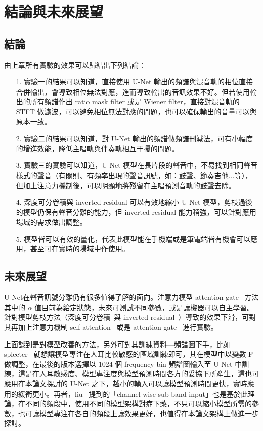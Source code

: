 \chapter{結論與未來展望}


\section{結論}

由上章所有實驗的效果可以歸結出下列結論：
\begin{itemize}
    \item[1.] 實驗一的結果可以知道，直接使用 U-Net 輸出的頻譜與混音軌的相位直接合併輸出，會導致相位無法對應，進而導致輸出的音訊效果不好。但若使用輸出的所有頻譜作出 ratio mask filter 或是 Wiener filter，直接對混音軌的 STFT 做濾波，可以避免相位無法對應的問題，也可以確保輸出的音量可以與原本一致。
    \item[2.] 實驗二的結果可以知道，對 U-Net 輸出的頻譜做頻譜刪減法，可有小幅度的增進效能，降低主唱軌與伴奏軌相互干擾的問題。
    \item[3.] 實驗三的實驗可以知道，U-Net 模型在長片段的聲音中，不易找到相同聲音樣式的聲音（有關則、有頻率出現的聲音訊號，如：鼓聲、節奏吉他...等），但加上注意力機制後，可以明顯地將殘留在主唱預測音軌的鼓聲去除。
    \item[4.] 深度可分卷積與 inverted residual 可以有效地縮小 U-Net 模型，剪枝過後的模型仍保有聲音分離的能力，但 inverted residual 能力稍強，可以針對應用場域的需求做出調整。
    \item[5.] 模型皆可以有效的量化，代表此模型能在手機端或是筆電端皆有機會可以應用，甚至可在實時的場域中作使用。
\end{itemize}


\section{未來展望}

U-Net在聲音訊號分離仍有很多值得了解的面向。注意力模型 attention gate~\cite{oktay2018attention} 方法其中的 $\alpha$ 值目前為給定狀態，未來可測試不同參數，或是讓機器可以自主學習。針對模型剪枝方法（深度可分卷積~\cite{chollet2017xception,howard2017mobilenets}與 inverted residual~\cite{sandler2018mobilenetv2}）導致的效果下滑，可對其再加上注意力機制 self-attention~\cite{shaw2018self} 或是 attention gate~\cite{oktay2018attention} 進行實驗。

上面談到是對模型改善的方法，另外可對其訓練資料—頻譜圖下手，比如 spleeter~\cite{hennequin2020spleeter} 就想讓模型專注在人耳比較敏感的區域訓練即可，其在模型中以變數 F 做調整，在最後的版本選擇以 1024 個 frequency bin 頻譜圖輸入至 U-Net 中訓練，這是在人耳敏感度、模型專注度與模型預測時間各方的妥協下所產生，這也可應用在本論文探討的 U-Net 之下，越小的輸入可以讓模型預測時間更快，實時應用的緩衝更小。再者，liu~\cite{liu2020channel} 提到的「channel-wise sub-band input」也是基於此理論，在不同的頻段中，使用不同的模型架構對症下藥，不只可以縮小模型所需的參數，也可讓模型專注在各自的頻段上讓效果更好，也值得在本論文架構上做進一步探討。

